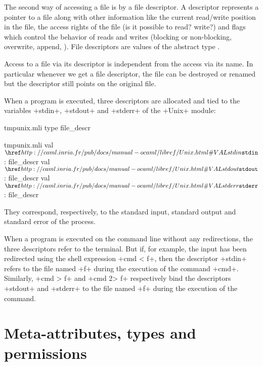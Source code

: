 The second way of accessing a file is by a file descriptor. A
descriptor represents a pointer to a file along with other information
like the current read/write position in the file, the access rights of
the file (is it possible to read? write?) and flags which control the
behavior of reads and writes (blocking or non-blocking, overwrite,
append, \etc). File descriptors are values of the abstract type
.

Access to a file via its descriptor is independent from the
access via its name. In particular whenever we get a file descriptor,
the file can be destroyed or renamed but the descriptor still points
on the original file.

When a program is executed, three descriptors are allocated and 
tied to the variables \ml+stdin+, \ml+stdout+ and \ml+stderr+ of the
\ml+Unix+ module:
\begin{codefile}{tmpunix.mli}
type file_descr
\end{codefile}
\begin{listingcodefile}{tmpunix.mli}
val $\indexlibvalue{Unix}{stdin}$ : file_descr
val $\indexlibvalue{Unix}{stdout}$ : file_descr
val $\indexlibvalue{Unix}{stderr}$ : file_descr
\end{listingcodefile}
They correspond, respectively, to the standard input, standard output
and standard error of the process.

When a program is executed on the command line without any
redirections, the three descriptors refer to the terminal.  But if,
for example, the input has been redirected using the shell expression
\ml+cmd < f+, then the descriptor \ml+stdin+ refers to the file named \ml+f+
during the execution of the command \ml+cmd+. Similarly, \ml +cmd > f+
and \ml+cmd 2> f+ respectively bind the descriptors \ml+stdout+ and
\ml+stderr+ to the file named \ml+f+ during the execution of the
command.


\section{Meta-attributes, types and permissions}

